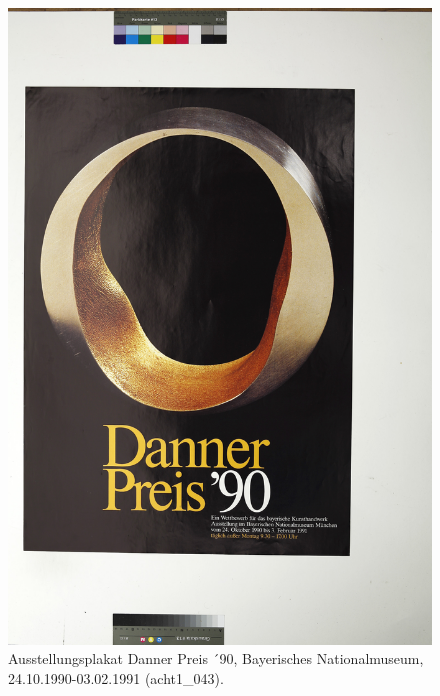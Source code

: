\documentclass[a4paper,12pt,ngerman]{article}
\begin{document}
\newpage
\begin{figure}[ht]
\includegraphics[width=\linewidth]{Abbildung_35_(acht1_043)}
\centering
\caption{Ausstellungsplakat Danner Preis ´90, Bayerisches Nationalmuseum, 24.10.1990-03.02.1991 (acht1\_043).}
\end{figure}
\end{document}
